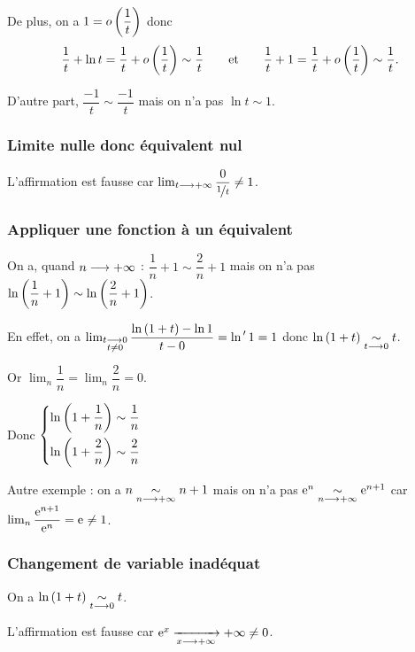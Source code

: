 De plus, on a \(1=o\left(\dfrac{1}{t}\right)\) donc \[\dfrac{1}{t}+\ln t=\dfrac{1}{t}+o\left(\dfrac{1}{t}\right)\sim\dfrac{1}{t}\qquad\text{et}\qquad\dfrac{1}{t}+1=\dfrac{1}{t}+o\left(\dfrac{1}{t}\right)\sim\dfrac{1}{t}.\]

D'autre part, \(\dfrac{-1}{t}\sim\dfrac{-1}{t}\) mais on n'a pas \(\ln t\sim1\).

\subsubsection{Limite nulle donc équivalent nul}

L'affirmation  est fausse car \(\lim_{t\longrightarrow+\infty}\dfrac{0}{\nicefrac{1}{t}}\not=1\).

\subsubsection{Appliquer une fonction à un équivalent}

On a, quand \(n\longrightarrow+\infty\) : \(\dfrac{1}{n}+1\sim\dfrac{2}{n}+1\) mais on n'a pas \(\ln\left(\dfrac{1}{n}+1\right)\sim\ln\left(\dfrac{2}{n}+1\right)\).

En effet, on a \(\lim_{\substack{t\longrightarrow0 \\ t\not=0}}\dfrac{\ln\left(1+t\right)-\ln1}{t-0}=\ln^{\,\prime}1=1\) donc \(\ln\left(1+t\right)\underset{t\longrightarrow0}{\sim}t\).

Or \(\lim_n\dfrac{1}{n}=\lim_n\dfrac{2}{n}=0\).

Donc \(\begin{dcases}
\ln\left(1+\dfrac{1}{n}\right)\sim\dfrac{1}{n} \\
\ln\left(1+\dfrac{2}{n}\right)\sim\dfrac{2}{n}
\end{dcases}\)

Autre exemple : on a \(n\underset{n\longrightarrow+\infty}{\sim}n+1\) mais on n'a pas \(\mathrm{e}^{n}\underset{n\longrightarrow+\infty}{\sim}\mathrm{e}^{n+1}\) car \(\lim_n\dfrac{\mathrm{e}^{n+1}}{\mathrm{e}^{n}}=\mathrm{e}^{}\not=1\).

\subsubsection{Changement de variable inadéquat}

On a \(\ln\left(1+t\right)\underset{t\longrightarrow0}{\sim}t\).

L'affirmation  est fausse car \(\mathrm{e}^{x}\xrightarrow[x\longrightarrow+\infty]{}+\infty\not=0\).
